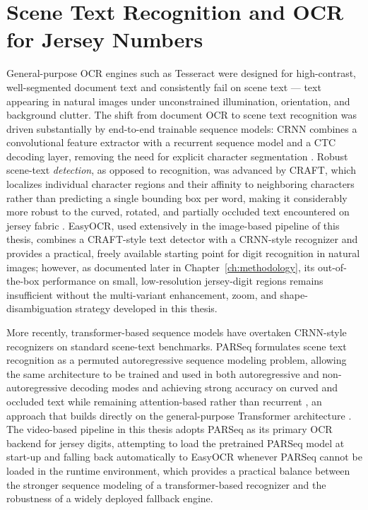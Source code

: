 \section{Scene Text Recognition and OCR for Jersey Numbers}

General-purpose OCR engines such as Tesseract were designed for
high-contrast, well-segmented document text and consistently fail on
scene text --- text appearing in natural images under unconstrained
illumination, orientation, and background clutter. The shift from
document OCR to scene text recognition was driven substantially by
end-to-end trainable sequence models: CRNN combines a convolutional
feature extractor with a recurrent sequence model and a CTC decoding
layer, removing the need for explicit character segmentation
\cite{shi2017crnn}. Robust scene-text \emph{detection}, as opposed to
recognition, was advanced by CRAFT, which localizes individual
character regions and their affinity to neighboring characters rather
than predicting a single bounding box per word, making it considerably
more robust to the curved, rotated, and partially occluded text
encountered on jersey fabric \cite{baek2019craft}. EasyOCR, used
extensively in the image-based pipeline of this thesis, combines a
CRAFT-style text detector with a CRNN-style recognizer and provides a
practical, freely available starting point for digit recognition in
natural images; however, as documented later in
Chapter~\ref{ch:methodology}, its out-of-the-box performance on small,
low-resolution jersey-digit regions remains insufficient without the
multi-variant enhancement, zoom, and shape-disambiguation strategy
developed in this thesis.

More recently, transformer-based sequence models have overtaken
CRNN-style recognizers on standard scene-text benchmarks. PARSeq
formulates scene text recognition as a permuted autoregressive sequence
modeling problem, allowing the same architecture to be trained and
used in both autoregressive and non-autoregressive decoding modes and
achieving strong accuracy on curved and occluded text while remaining
attention-based rather than recurrent \cite{bautista2022parseq}, an
approach that builds directly on the general-purpose Transformer
architecture \cite{vaswani2017attention}. The video-based pipeline in
this thesis adopts PARSeq as its primary OCR backend for jersey digits,
attempting to load the pretrained PARSeq model at start-up and falling
back automatically to EasyOCR whenever PARSeq cannot be loaded in the
runtime environment, which provides a practical balance between the
stronger sequence modeling of a transformer-based recognizer and the
robustness of a widely deployed fallback engine.

